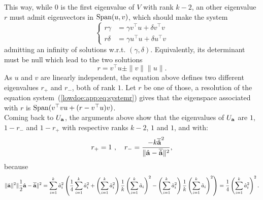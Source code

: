 This way, while $0$ is the first eigenvalue of $V$ with rank $k-2$, an other eigenvalue $r$ must admit eigenvectors in $\operatorname{Span}(u,v)$, which should make the system
    \begin{equation}\label{lowdoe:app:eq:systemr}
        \left\{\begin{array}{rl}
             r\gamma &= \gamma v^{\top}u+\delta v^{\top}v  \\
             r\delta &= \gamma u^{\top}u + \delta u^{\top}v 
        \end{array}  \right.
    \end{equation}
admitting an infinity of solutions w.r.t.{ }$(\gamma,\delta)$. Equivalently, its determinant must be null which lead to the two solutions 
    \begin{equation}
        r = v^{\top}u \pm \|v\|\|u\|.
    \end{equation}
As $u$ and $v$ are linearly independent, the equation above defines two different eigenvalues $r_+$ and $r_-$, both of rank $1$.
Let $r$ be one of those, a resolution of the equation system~(\ref{lowdoe:app:eq:systemr}) gives that the eigenspace associated with $r$ is $\operatorname{Span}(v^{\top}vu+(r-v^{\top}u)v)$.\\

Coming back to $U_{\mathbf{a}}$, the arguments above show that the eigenvalues of $U_{\mathbf{a}}$ are $1$, $1-r_-$ and $1-r_+$ with respective ranks $k-2$, $1$ and $1$, and with:
\begin{equation}
    r_+ = 1 \ ,\quad r_- = \frac{- k\overline{\hat{\mathbf{a}}}^2}{\|\hat{\mathbf{a}}-\overline{\hat{\mathbf{a}}} \|^2},
\end{equation}
because 
\begin{equation}
    \|\hatmbf a\|^2\|\frac{1}{2}\hatmbf a - \overline{\hatmbf a} \|^2  = \sum_{i=1}^k\hat a_i^2
    \left(\frac{1}{4}\sum_{i=1}^k\hat a_i^2 + \left(\sum_{i=1}^k\hat a_i^2\right)\frac{1}{k}\left(\sum_{i=1}^k\hat a_i\right)^2 - \left(\sum_{i=1}^k\hat a_i^2\right)\frac{1}{k}\left(\sum_{i=1}^k\hat a_i \right)^2 \right)
        = \frac{1}{4}\left(\sum_{i=1}^k\hat a_i^2\right)^2. %
\end{equation}

